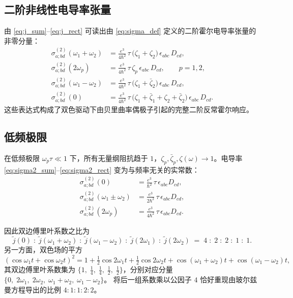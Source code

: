 \subsection{二阶非线性电导率张量}

由 \eqref{eq:j_sum}--\eqref{eq:j_rect} 可读出由 \eqref{eq:sigma_def} 定义的二阶霍尔电导率张量的非零分量：
\begin{align}
\sigma^{(2)}_{a;bd}(\omega_1+\omega_2) &= \frac{e^3}{4\hbar^2}\,\tau\,
\big(\zeta_1+\zeta_2\big)\,\epsilon_{abc}\,D_{cd}, \label{eq:sigma2_sum}\\
\sigma^{(2)}_{a;bd}(2\omega_p) &= \frac{e^3}{4\hbar^2}\,\tau\,\zeta_p\,\epsilon_{abc}\,D_{cd},
\qquad p=1,2, \label{eq:sigma2_2w}\\
\sigma^{(2)}_{a;bd}(\omega_1-\omega_2) &= \frac{e^3}{4\hbar^2}\,\tau\,
\big(\zeta_1+\bar\zeta_2\big)\,\epsilon_{abc}\,D_{cd}, \label{eq:sigma2_diff}\\
\sigma^{(2)}_{a;bd}(0) &= \frac{e^3}{4\hbar^2}\,\tau\,
\big(\zeta_1+\bar\zeta_1+\zeta_2+\bar\zeta_2\big)\,\epsilon_{abc}\,D_{cd}. \label{eq:sigma2_rect}
\end{align}
这些表达式构成了双色驱动下由贝里曲率偶极子引起的完整二阶反常霍尔响应。

\subsection{低频极限}

在低频极限 \(\omega_p\tau \ll 1\) 下，所有无量纲阻抗趋于 \(1\)，\(\zeta_p,\bar\zeta_p,\zeta(\omega) \to 1\)。电导率 \eqref{eq:sigma2_sum}--\eqref{eq:sigma2_rect} 变为与频率无关的实常数：
\[
\begin{aligned}
\sigma^{(2)}_{a;bd}(0) &= \frac{e^3}{\hbar^2}\,\tau\,\epsilon_{abc}D_{cd},\\[4pt]
\sigma^{(2)}_{a;bd}(\omega_1\pm\omega_2) &= \frac{e^3}{2\hbar^2}\,\tau\,\epsilon_{abc}D_{cd},\\[4pt]
\sigma^{(2)}_{a;bd}(2\omega_p) &= \frac{e^3}{4\hbar^2}\,\tau\,\epsilon_{abc}D_{cd}.
\end{aligned}
\]

因此双边傅里叶系数之比为
\[
\tilde j(0) \;:\; \tilde j(\omega_1+\omega_2) \;:\; \tilde j(\omega_1-\omega_2) \;:\; \tilde j(2\omega_1) \;:\; \tilde j(2\omega_2)
\;=\; 4 \;:\; 2 \;:\; 2 \;:\; 1 \;:\; 1 .
\]
另一方面，双色场的平方
\[
(\cos\omega_1 t+\cos\omega_2 t)^2 = 1 + \tfrac12\cos 2\omega_1 t + \tfrac12\cos 2\omega_2 t + \cos(\omega_1+\omega_2)t + \cos(\omega_1-\omega_2)t,
\]
其双边傅里叶系数集为 \(\{1,\; \tfrac14,\;\tfrac14,\;\tfrac12,\;\tfrac12\}\)，分别对应分量 \(\{0,\;2\omega_1,\;2\omega_2,\;\omega_1+\omega_2,\;\omega_1-\omega_2\}\)。  
将后一组系数乘以公因子 \(4\) 恰好重现由玻尔兹曼方程导出的比例 \(4:1:1:2:2\)。

